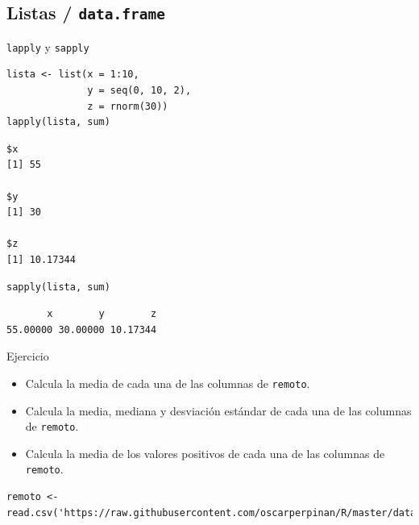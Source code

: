 \documentclass[xcolor={usenames,svgnames,dvipsnames}]{beamer}
\begin{document}
\subsection{Listas / \texttt{data.frame}}
\label{sec:org614354e}
\begin{frame}[fragile,label={sec:orgdaadcf3}]{\texttt{lapply} y \texttt{sapply}}
 \lstset{language=r,label= ,caption= ,captionpos=b,numbers=none}
\begin{lstlisting}
lista <- list(x = 1:10,
              y = seq(0, 10, 2),
              z = rnorm(30))
lapply(lista, sum)
\end{lstlisting}

\begin{verbatim}
$x
[1] 55

$y
[1] 30

$z
[1] 10.17344
\end{verbatim}

\lstset{language=r,label= ,caption= ,captionpos=b,numbers=none}
\begin{lstlisting}
sapply(lista, sum)
\end{lstlisting}

\begin{verbatim}
       x        y        z 
55.00000 30.00000 10.17344
\end{verbatim}
\end{frame}

\begin{frame}[fragile,label={sec:orga122d1d}]{Ejercicio}
 \begin{block}{}
\begin{itemize}
\item Calcula la media de cada una de las columnas de \texttt{remoto}.
\item Calcula la media, mediana y desviación estándar de cada una de las columnas de \texttt{remoto}.
\item Calcula la media de los valores positivos de cada una de las columnas de \texttt{remoto}.
\end{itemize}
\end{block}

\begin{block}{}
\lstset{language=r,label= ,caption= ,captionpos=b,numbers=none}
\begin{lstlisting}
remoto <- read.csv('https://raw.githubusercontent.com/oscarperpinan/R/master/data/aranjuez.csv')
\end{lstlisting}
\end{block}
\end{frame}
\end{document}

